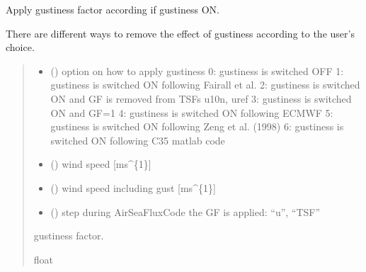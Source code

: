 \documentclass[letterpaper,10pt,english]{sphinxmanual}
\begin{document}
\begin{fulllineitems}

\pysigstartsignatures
{}
\pysigstopsignatures
\sphinxAtStartPar
Apply gustiness factor according if gustiness ON.

\sphinxAtStartPar
There are different ways to remove the effect of gustiness according to
the user’s choice.
\begin{quote}\begin{description}
\begin{itemize}
\item {} 
\sphinxAtStartPar
{} () \textendash{} option on how to apply gustiness
0: gustiness is switched OFF
1: gustiness is switched ON following Fairall et al.
2: gustiness is switched ON and GF is removed from TSFs u10n, uref
3: gustiness is switched ON and GF=1
4: gustiness is switched ON following ECMWF
5: gustiness is switched ON following Zeng et al. (1998)
6: gustiness is switched ON following C35 matlab code

\item {} 
\sphinxAtStartPar
{} () \textendash{} wind speed                      {[}ms\textasciicircum{}\{\sphinxhyphen{}1\}{]}

\item {} 
\sphinxAtStartPar
{} () \textendash{} wind speed including gust       {[}ms\textasciicircum{}\{\sphinxhyphen{}1\}{]}

\item {} 
\sphinxAtStartPar
{} () \textendash{} step during AirSeaFluxCode the GF is applied: “u”, “TSF”

\end{itemize}

\sphinxAtStartPar
{} \textendash{} gustiness factor.

\sphinxAtStartPar
float

\end{description}\end{quote}

\end{fulllineitems}
\end{document}
